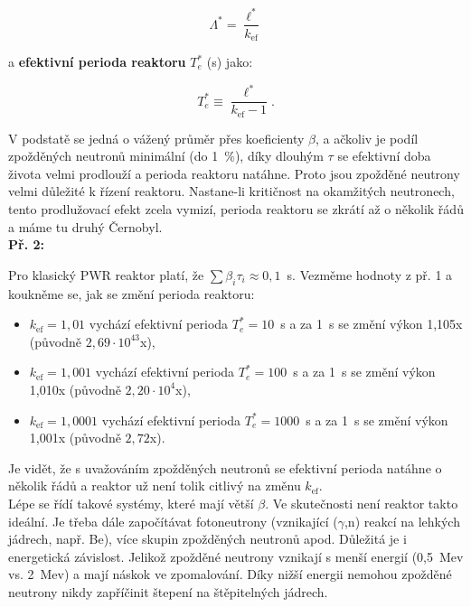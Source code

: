\begin{equation}
  \boxed{
  \Lambda^* = \dfrac{\ell^*}{k_{\text{ef}}}
  \label{efektivni_stredni_doba_vzniku}}
\end{equation}

a \textbf{efektivní perioda reaktoru} $T_e^*$ (s) jako:

\begin{equation}
  \boxed{
  T_e^* \equiv \dfrac{\ell^*}{k_{\text{ef}} - 1}.
  \label{efektivni_perioda}}
\end{equation}

V podstatě se jedná o vážený průměr přes koeficienty $\beta$, a ačkoliv je podíl zpožděných neutronů minimální (do 1~\%), díky dlouhým $\tau$ se efektivní doba života velmi prodlouží a perioda reaktoru natáhne. Proto jsou zpožděné neutrony velmi důležité k řízení reaktoru. Nastane-li kritičnost na okamžitých neutronech, tento prodlužovací efekt zcela vymizí, perioda reaktoru se zkrátí až o několik řádů a máme tu druhý Černobyl.\\

\textbf{Př. 2:}

Pro klasický PWR reaktor platí, že $\sum \beta_i \tau_i \approx 0,1$~s. Vezměme hodnoty z př. 1 a koukněme se, jak se změní perioda reaktoru:

\begin{itemize}
  \item $k_{\text{ef}} = 1,01$ vychází efektivní perioda $T_e^* = 10$~s a za 1~s se změní výkon 1,105x (původně $2,69 \cdot 10^{43}$x),
  \item $k_{\text{ef}} = 1,001$ vychází efektivní perioda $T_e^* = 100$~s a za 1~s se změní výkon 1,010x (původně $2,20 \cdot 10^{4}$x),
  \item $k_{\text{ef}} = 1,0001$ vychází efektivní perioda $T_e^* = 1000$~s a za 1~s se změní výkon 1,001x (původně $2,72$x).
\end{itemize}

Je vidět, že s uvažováním zpožděných neutronů se efektivní perioda natáhne o několik řádů a reaktor už není tolik citlivý na změnu $k_{\text{ef}}$.\\

Lépe se řídí takové systémy, které mají větší $\beta$. Ve skutečnosti není reaktor takto ideální. Je třeba dále započítávat fotoneutrony (vznikající ($\gamma$,n) reakcí na lehkých jádrech, např. Be), více skupin zpožděných neutronů apod. Důležitá je i energetická závislost. Jelikož zpožděné neutrony vznikají s menší energií (0,5~Mev vs. 2~Mev) a mají náskok ve zpomalování. Díky nižší energii nemohou zpožděné neutrony nikdy zapříčinit štepení na štěpitelných jádrech.\\

